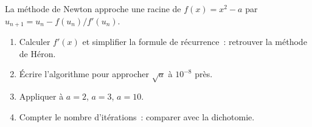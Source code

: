 \begin{bilan}
\begin{challenge}
La m\'ethode de Newton approche une racine de $f(x)=x^2-a$ par $u_{n+1}=u_n-f(u_n)/f'(u_n)$.
\begin{enumerate}
  \item Calculer $f'(x)$ et simplifier la formule de r\'ecurrence~:
        retrouver la m\'ethode de H\'eron.
  \item \'Ecrire l'algorithme pour approcher $\sqrt{a}$ \`a $10^{-8}$ pr\`es.
  \item Appliquer \`a $a=2$, $a=3$, $a=10$.
  \item Compter le nombre d'it\'erations~: comparer avec la dichotomie.
\end{enumerate}
\end{challenge}

\end{bilan}
